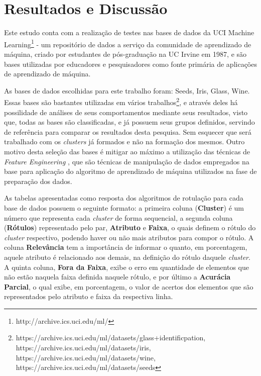\chapter{Resultados e Discussão}\label{cap:resultados}

Este estudo conta com a realização de testes nas bases de dados da UCI Machine Learning\footnote{http://archive.ics.uci.edu/ml/} - um repositório de dados a serviço da comunidade de aprendizado de máquina, criado por estudantes de pós-graduação na UC Irvine em 1987, e são bases utilizadas por educadores e pesquisadores como fonte primária de aplicações de aprendizado de máquina. 


As bases de dados escolhidas para este trabalho foram: Seeds, Iris, Glass, Wine. Essas bases são bastantes utilizadas em vários trabalhos\footnote{https://archive.ics.uci.edu/ml/datasets/glass+identificpation, https://archive.ics.uci.edu/ml/datasets/iris, https://archive.ics.uci.edu/ml/datasets/wine, https://archive.ics.uci.edu/ml/datasets/seeds}, e através deles há possilidade de análises de seus comportamentos mediante seus resultados, visto que, todas as bases são classificadas, e já possuem seus grupos definidos, servindo de referência para  comparar  os resultados desta pesquisa. Sem esquecer que será trabalhado com os \textit{clusters} já formados e não na formação dos mesmos. Outro motivo desta seleção das bases  é mitigar ao máximo a utilização das técnicas de \textit{Feature Engineering} \cite{Casari2018}, que são técnicas de manipulação de dados empregados na base para aplicação do algoritmo de aprendizado de máquina utilizados na fase de preparação dos dados.
 

As tabelas apresentadas como resposta dos algoritmos de rotulação para cada base de dados possuem o seguinte formato: a primeira coluna (\textbf{Cluster}) é um número que representa cada \textit{cluster} de forma sequencial, a segunda coluna (\textbf{Rótulos}) representado pelo par, \textbf{Atributo} e \textbf{Faixa}, o quais definem o rótulo do \textit{cluster} respectivo, podendo haver ou não mais atributos para compor o rótulo. A coluna \textbf{Relevância} tem a importância de informar o quanto, em porcentagem, aquele atributo é relacionado aos demais, na definição do rótulo daquele \textit{cluster}. A quinta coluna, \textbf{Fora da Faixa}, exibe o erro em quantidade de elementos que não estão naquela faixa definida naquele rótulo, e por último a \textbf{Acurácia Parcial}, o qual exibe, em porcentagem, o valor de acertos dos elementos que são representados pelo atributo e faixa da respectiva linha. 

